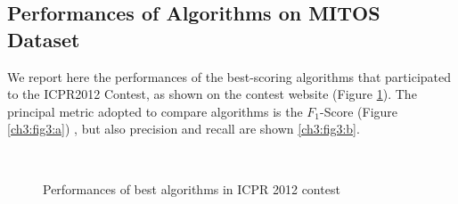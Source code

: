 \subsection{Performances of Algorithms on MITOS Dataset}

We report here the performances of the best-scoring algorithms that participated to the ICPR2012 Contest, as shown on the contest website (Figure \ref{ch3:fig3}).
The principal metric adopted to compare algorithms is the $F_1$-Score (Figure \ref{ch3:fig3:a}) , but also precision and recall are shown \ref{ch3:fig3:b}. 

\begin{figure}[!htb]
  \centering
    \\
    \caption{Performances of best algorithms in ICPR 2012 contest}
    \label{ch3:fig3}
\end{figure}












